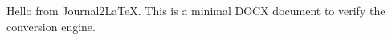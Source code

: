 \documentclass[
]{article}
\author{}
\date{}
\begin{document}
Hello from Journal2LaTeX. This is a minimal DOCX document to verify the
conversion engine.
\end{document}

